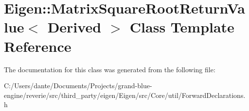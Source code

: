 \hypertarget{class_eigen_1_1_matrix_square_root_return_value}{}\section{Eigen\+::Matrix\+Square\+Root\+Return\+Value$<$ Derived $>$ Class Template Reference}
\label{class_eigen_1_1_matrix_square_root_return_value}


The documentation for this class was generated from the following file\+:\begin{DoxyCompactItemize}
\item 
C\+:/\+Users/dante/\+Documents/\+Projects/grand-\/blue-\/engine/reverie/src/third\+\_\+party/eigen/\+Eigen/src/\+Core/util/Forward\+Declarations.\+h\end{DoxyCompactItemize}

